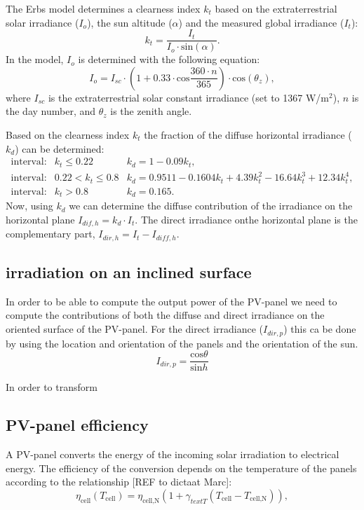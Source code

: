 The Erbs model determines a clearness index $k_t$ based on the extraterrestrial solar irradiance ($I_o$), the sun altitude ($\alpha$) and the measured global irradiance ($I_t$):
\begin{equation}
	k_t = \frac{I_t}{I_o\cdot \text{sin}\left(\alpha\right)}.
\end{equation}
In the model, $I_o$ is determined with the following equation:
\begin{equation}
	I_o = I_{sc} \cdot \left(1 + 0.33\cdot\text{cos}\frac{360\cdot n}{365}\right)\cdot \text{cos}\left(\theta_z\right) ,
\end{equation}
where $I_{sc}$ is the extraterrestrial solar constant irradiance (set to 1367 W/$\text{m}^2$), $n$ is the day number, and $\theta_z$ is the zenith angle.

Based on the clearness index $k_t$ the fraction of the diffuse horizontal irradiance ($k_d$) can be determined:
\begin{eqnarray}
	\text{interval:} & k_t \leq 0.22 & k_d = 1 - 0.09k_t ,\\
	\text{interval:} & 0.22 < k_t \leq 0.8 & k_d = 0.9511 - 0.1604 k_t + 4.39 k_t^2 -16.64 k_t^3 + 12.34 k_t^4 , \\
	\text{interval:} & k_t > 0.8 & k_d = 0.165 .
\label{eq:diffuse_fraction}
\end{eqnarray} 
Now, using $k_d$ we can determine the diffuse contribution of the irradiance on the horizontal plane $I_{dif,h} = k_d \cdot I_t$. The direct irradiance onthe horizontal plane is the complementary part, $I_{dir,h} = I_t - I_{diff,h}$. 

\subsection{irradiation on an inclined surface}
In order to be able to compute the output power of the PV-panel we need to compute the contributions of both the diffuse and direct irradiance on the oriented surface of the PV-panel. For the direct irradiance ($I_{dir,p}$) this ca be done by using the location and orientation of the panels and the orientation of the sun.
\begin{equation}
		I_{dir,p} = \frac{\text{cos}\theta}{\text{sin}h}
\label{eq:direct_plane}
\end{equation}


In order to transform    



\subsection{PV-panel efficiency}
A PV-panel converts the energy of the incoming solar irradiation to electrical energy. The efficiency of the conversion depends on the temperature of the panels according to the relationship [REF to dictaat Marc]:
\begin{equation}
  \eta_{\text{cell}}(T_{\text{cell}}) = \eta_{\text{cell,N}} \left( 1 + \gamma_{text{T}}\left(T_{\text{cell}} - T_{\text{cell,N}} \right) \right),
\end{equation}   

